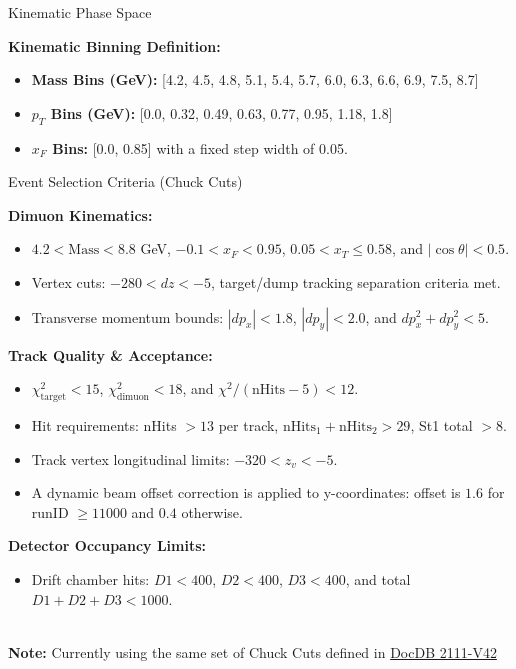 \documentclass[aspectratio=169]{beamer}
\begin{document}
\begin{frame}{Kinematic Phase Space}
    
\textbf{Kinematic Binning Definition:}
\begin{itemize}
    \item \textbf{Mass Bins (GeV):} [4.2, 4.5, 4.8, 5.1, 5.4, 5.7, 6.0, 6.3, 6.6, 6.9, 7.5, 8.7]
    \item \textbf{$p_T$ Bins (GeV):} [0.0, 0.32, 0.49, 0.63, 0.77, 0.95, 1.18, 1.8]
    \item \textbf{$x_F$ Bins:} [0.0, 0.85] with a fixed step width of 0.05.
\end{itemize}

\end{frame}

\begin{frame}{Event Selection Criteria (Chuck Cuts)}
    \footnotesize
    
\textbf{Dimuon Kinematics:}
\begin{itemize}
    \item $4.2 < \text{Mass} < 8.8$ GeV, $-0.1 < x_F < 0.95$, $0.05 < x_T \le 0.58$, and $|\cos\theta| < 0.5$.
    \item Vertex cuts: $-280 < dz < -5$, target/dump tracking separation criteria met.
    \item Transverse momentum bounds: $|dp_x| < 1.8$, $|dp_y| < 2.0$, and $dp_x^2 + dp_y^2 < 5$.
\end{itemize}
\vspace{0.2cm}
\textbf{Track Quality \& Acceptance:}
\begin{itemize}
    \item $\chi^2_{\text{target}} < 15$, $\chi^2_{\text{dimuon}} < 18$, and $\chi^2/(\text{nHits}-5) < 12$.
    \item Hit requirements: nHits $> 13$ per track, $\text{nHits}_1+\text{nHits}_2 > 29$, St1 total $> 8$.
    \item Track vertex longitudinal limits: $-320 < z_v < -5$.
    \item A dynamic beam offset correction is applied to y-coordinates: offset is $1.6$ for runID $\ge 11000$ and $0.4$ otherwise.
\end{itemize}
\vspace{0.2cm}
\textbf{Detector Occupancy Limits:}
\begin{itemize}
    \item Drift chamber hits: $D1 < 400$, $D2 < 400$, $D3 < 400$, and total $D1+D2+D3 < 1000$.
\end{itemize}\\
\vspace{0.3cm}
\textbf{Note:} Currently using the same set of Chuck Cuts defined in \href{https://seaquest-docdb.fnal.gov/cgi-bin/sso/ShowDocument?docid=2111}{DocDB 2111-V42}

\end{frame}
\end{document}
